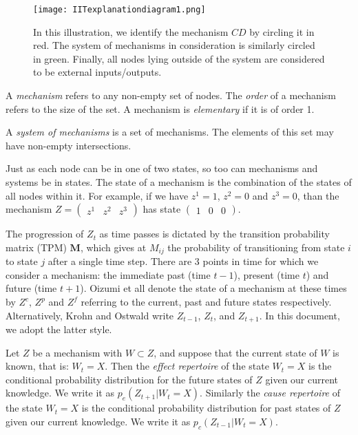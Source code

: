 \begin{figure}[ht]
	\centering
	
	\texttt{[image: IITexplanationdiagram1.png]}
	\caption{In this illustration, we identify the mechanism $CD$ by circling it in red. The system of mechanisms in consideration is similarly circled in green. Finally, all nodes lying outside of the system are considered to be external inputs/outputs.}
	\label{fig:IIT_illustration1}
\end{figure}


\begin{definition}{A \textit{mechanism} refers to any non-empty set of nodes. The \textit{order} of a mechanism refers to the size of the set. A mechanism is \textit{elementary} if it is of order 1.}
\end{definition}

\begin{definition}{A \textit{system of mechanisms} is a set of mechanisms. The elements of this set may have non-empty intersections.}
\end{definition}


Just as each node can be in one of two states, so too can mechanisms and systems be in states. The state of a mechanism is the combination of the states of all nodes within it. For example, if we have $z^1=1$, $z^2=0$ and $z^3=0$, than the mechanism $Z = \left(\begin{array}{ccc}z^1&z^2&z^3\end{array}\right)$ has state $\left(\begin{array}{ccc}1&0&0\end{array}\right)$. 


The progression of $Z_t$ as time passes is dictated by the transition probability matrix (TPM) $\mathbf{M}$, which gives at $M_{ij}$ the probability of transitioning from state $i$ to state $j$ after a single time step. There are 3 points in time for which we consider a mechanism: the immediate past (time $t-1$), present (time $t$) and future (time $t+1$). Oizumi et all \cite{oizumi2014phenomenology} denote the state of a mechanism at these times by $Z^c$, $Z^p$ and $Z^f$ referring to the current, past and future states respectively. Alternatively, Krohn and Ostwald \cite{krohn2016computing} write $Z_{t-1}$, $Z_{t}$, and $Z_{t+1}$. In this document, we adopt the latter style.


\begin{definition}
	{Let $Z$ be a mechanism with $W\subset Z$, and suppose that the current state of $W$ is known, that is: $W_t = X$. Then the \textit{effect repertoire} of the state $W_t = X$ is the conditional probability distribution for the future states of $Z$ given our current knowledge. We write it as $p_e(Z_{t+1}|W_t=X)$. Similarly the \textit{cause repertoire} of the state $W_t = X$ is the conditional probability distribution for past states of $Z$ given our current knowledge. We write it as $p_c(Z_{t-1}|W_t = X)$.}
\end{definition}


